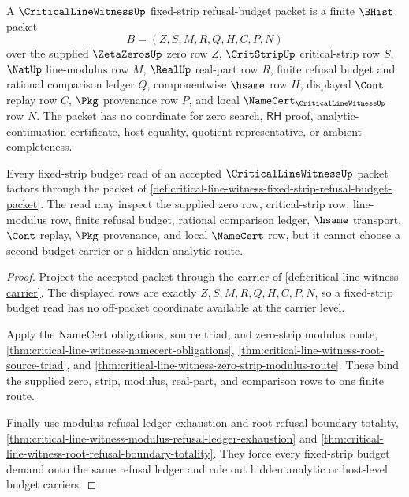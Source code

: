 \begin{definition}
\label{def:critical-line-witness-fixed-strip-refusal-budget-packet}
A $\CriticalLineWitnessUp$ fixed-strip refusal-budget packet is a finite $\BHist$ packet
$$
B=(Z,S,M,R,Q,H,C,P,N)
$$
over the supplied $\ZetaZerosUp$ zero row $Z$, $\CritStripUp$ critical-strip row $S$, $\NatUp$ line-modulus row $M$, $\RealUp$ real-part row $R$, finite refusal budget and rational comparison ledger $Q$, componentwise $\hsame$ row $H$, displayed $\Cont$ replay row $C$, $\Pkg$ provenance row $P$, and local $\NameCert_{\CriticalLineWitnessUp}$ row $N$. The packet has no coordinate for zero search, $\mathsf{RH}$ proof, analytic-continuation certificate, host equality, quotient representative, or ambient completeness.
\end{definition}

\begin{theorem}
\label{thm:critical-line-witness-fixed-strip-budget-route-determinacy}
Every fixed-strip budget read of an accepted $\CriticalLineWitnessUp$ packet factors through the packet of \autoref{def:critical-line-witness-fixed-strip-refusal-budget-packet}. The read may inspect the supplied zero row, critical-strip row, line-modulus row, finite refusal budget, rational comparison ledger, $\hsame$ transport, $\Cont$ replay, $\Pkg$ provenance, and local $\NameCert$ row, but it cannot choose a second budget carrier or a hidden analytic route.
\end{theorem}
\begin{proof}
Project the accepted packet through the carrier of \autoref{def:critical-line-witness-carrier}. The displayed rows are exactly $Z,S,M,R,Q,H,C,P,N$, so a fixed-strip budget read has no off-packet coordinate available at the carrier level.

Apply the NameCert obligations, source triad, and zero-strip modulus route, \autoref{thm:critical-line-witness-namecert-obligations}, \autoref{thm:critical-line-witness-root-source-triad}, and \autoref{thm:critical-line-witness-zero-strip-modulus-route}. These bind the supplied zero, strip, modulus, real-part, and comparison rows to one finite route.

Finally use modulus refusal ledger exhaustion and root refusal-boundary totality, \autoref{thm:critical-line-witness-modulus-refusal-ledger-exhaustion} and \autoref{thm:critical-line-witness-root-refusal-boundary-totality}. They force every fixed-strip budget demand onto the same refusal ledger and rule out hidden analytic or host-level budget carriers.
\end{proof}

